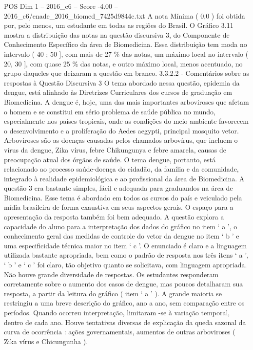 \begin{textsample}{POS Dim 1 – 2016\_c6 – Score -4.00 – 2016\_c6/enade\_2016\_biomed\_7425d9844e.txt}
A nota Mínima ( 0,0 ) foi obtida por, pelo menos, um estudante em todas as regiões do Brasil.
O Gráfico 3.11 mostra a distribuição das notas na questão discursiva 3, do Componente de Conhecimento Específico da área de Biomedicina.
Essa distribuição tem moda no intervalo ( 40 ; 50 ], com mais de 27 \% das notas, um máximo local no intervalo ( 20, 30 ], com quase 25 \% das notas, e outro máximo local, menos acentuado, no grupo daqueles que deixaram a questão em branco. 3.3.2.2 - Comentários sobre as respostas à Questão Discursiva 3 O tema abordado nessa questão, epidemia da dengue, está alinhado às Diretrizes Curriculares dos cursos de graduação em Biomedicina.
A dengue é, hoje, uma das mais importantes arboviroses que afetam o homem e se constitui em sério problema de saúde pública no mundo, especialmente nos países tropicais, onde as condições do meio ambiente favorecem o desenvolvimento e a proliferação do Aedes aegypti, principal mosquito vetor.
Arboviroses são as doenças causadas pelos chamados arbovírus, que incluem o vírus da dengue, Zika vírus, febre Chikungunya e febre amarela, causas de preocupação atual dos órgãos de saúde.
O tema dengue, portanto, está relacionado ao processo saúde-doença do cidadão, da família e da comunidade, integrado à realidade epidemiológica e ao profissional da área de Biomedicina.
A questão 3 era bastante simples, fácil e adequada para graduandos na área de Biomedicina.
Esse tema é abordado em todos os cursos do país e veiculado pela mídia brasileira de forma exaustiva em seus aspectos gerais.
O espaço para a apresentação da resposta também foi bem adequado.
A questão explora a capacidade do aluno para a interpretação dos dados do gráfico no item ‘ a ’, o conhecimento geral das medidas de controle do vetor da dengue no item ‘ b ’ e uma especificidade técnica maior no item ‘ c ’.
O enunciado é claro e a linguagem utilizada bastante apropriada, bem como o padrão de resposta nos três itens ‘ a ’, ‘ b ’ e ‘ c ’ foi claro, tão objetivo quanto se solicitava, com linguagem apropriada.
Não houve grande diversidade de respostas.
Os estudantes responderam corretamente sobre o aumento dos casos de dengue, mas poucos detalharam sua resposta, a partir da leitura do gráfico ( item ‘ a ’ ).
A grande maioria se restringiu a uma breve descrição do gráfico, ano a ano, sem comparação entre os períodos.
Quando ocorreu interpretação, limitaram -se à variação temporal, dentro de cada ano.
Houve tentativas diversas de explicação da queda sazonal da curva de ocorrência : ações governamentais, aumentos de outras arboviroses ( Zika vírus e Chicungunha ).

\end{textsample}
